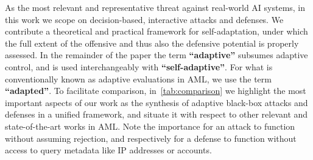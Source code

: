 As the most relevant and representative threat against real-world AI systems, in this work we scope on decision-based, interactive attacks and defenses.
We contribute a theoretical and practical framework for self-adaptation, under which the full extent of the offensive and thus also the defensive potential is properly assessed.
In the remainder of the paper the term \textbf{``adaptive''} subsumes adaptive control, and is used interchangeably with \textbf{``self-adaptive''}.
For what is conventionally known as adaptive evaluations in \gls{AML}, we use the term \textbf{``adapted''}.
To facilitate comparison, in~\autoref{tab:comparison} we highlight the most important aspects of our work as the synthesis of adaptive black-box attacks and defenses in a unified framework, and situate it with respect to other relevant and state-of-the-art works in \gls{AML}.
Note the importance for an attack to function without assuming rejection, and respectively for a defense to function without access to query metadata like IP addresses or accounts.

